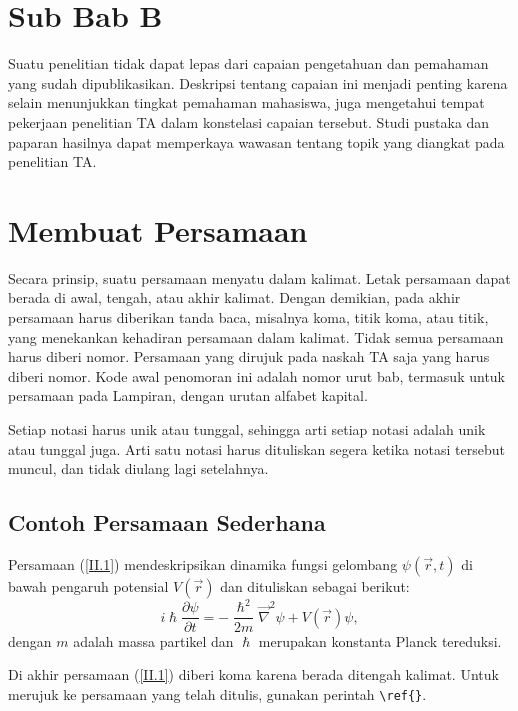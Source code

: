 \section{Sub Bab B}
\noindent Suatu penelitian tidak dapat lepas dari capaian pengetahuan dan pemahaman yang sudah dipublikasikan. Deskripsi tentang capaian ini menjadi penting karena selain menunjukkan tingkat pemahaman mahasiswa, juga mengetahui tempat pekerjaan penelitian TA dalam konstelasi capaian tersebut. Studi pustaka dan paparan hasilnya dapat memperkaya wawasan tentang topik yang diangkat pada penelitian TA.

\section{Membuat Persamaan}
\noindent Secara prinsip, suatu persamaan menyatu dalam kalimat. Letak persamaan dapat berada di awal, tengah, atau akhir kalimat. Dengan demikian, pada akhir persamaan harus diberikan tanda baca, misalnya koma, titik koma, atau titik, yang menekankan kehadiran persamaan dalam kalimat. Tidak semua persamaan harus diberi nomor. Persamaan yang dirujuk pada naskah TA saja yang harus diberi nomor. Kode awal penomoran ini adalah nomor urut bab, termasuk untuk persamaan pada Lampiran, dengan urutan alfabet kapital.

Setiap notasi harus unik atau tunggal, sehingga arti setiap notasi adalah unik atau tunggal juga. Arti satu notasi harus dituliskan segera ketika notasi tersebut muncul, dan tidak diulang lagi setelahnya.

\subsection{Contoh Persamaan Sederhana}
Persamaan (\ref{II.1}) mendeskripsikan dinamika fungsi gelombang $\psi(\vec{r},t)$ di bawah pengaruh potensial $V(\vec{r})$ dan dituliskan sebagai berikut:
\begin{equation}\label{II.1}
        i\hslash\frac{\partial \psi}{\partial t} = -\frac{\hslash^2}{2 m}\Vec{\nabla}^2 \psi + V(\vec{r})\psi,
\end{equation}
dengan $m$ adalah massa partikel dan $\hslash$ merupakan konstanta Planck tereduksi.

Di akhir persamaan (\ref{II.1}) diberi koma karena berada ditengah kalimat. Untuk merujuk ke persamaan yang telah ditulis, gunakan perintah \verb|\ref{}|.

